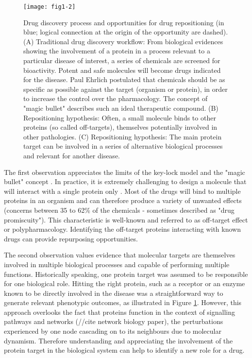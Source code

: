 \begin{figure}[ht]
    \centering
    \texttt{[image: fig1-2]}
    \caption{Drug discovery process and opportunities for drug repositioning (in blue; logical connection at the origin of the opportunity are dashed). (A) Traditional drug discovery workflow: From biological evidences showing the involvement of a protein in a process relevant to a particular disease of interest, a series of chemicals are screened for bioactivity. Potent and safe molecules will become drugs indicated for the disease. Paul Ehrlich postulated that chemicals should be as specific as possible against the target (organism or protein), in order to increase the control over the pharmacology. The concept of "magic bullet" describes such an ideal therapeutic compound. (B) Repositioning hypothesis: Often, a small molecule binds to other proteins (so called off-targets), themselves potentially involved in other pathologies. (C) Repositioning hypothesis: The main protein target can be involved in a series of alternative biological processes and relevant for another disease.}
    \label{fig1-2}
\end{figure}

The first observation appreciates the limits of the key-lock model and the "magic bullet" concept \citep{ehrlichwiki}. In practice, it is extremely challenging to design a molecule that will interact with a single protein only \citep{paolini2006global} \citep{li2010pubchem}. Most of the drugs will bind to multiple proteins in an organism and can therefore produce a variety of unwanted effects (concerns between 35 to 62\% of the chemicals - sometimes described as "drug promiscuity"). This characteristic is well-known and referred to as off-target effect or polypharmacology. Identifying the off-target proteins interacting with known drugs can provide repurposing opportunities.

The second observation values evidence that molecular targets are themselves involved in multiple biological processes and capable of performing multiple functions. Historically speaking, one protein target was assumed to be responsible for one biological role. Hitting the right protein, such as a receptor or an enzyme known to be directly involved in the disease was a straightforward way to generate relevant phenotypic outcomes, as illustrated in Figure \ref{fig1-2}. However, this approach overlooks the fact that proteins function in the context of signalling pathways and networks (//cite network biology paper), the perturbations experienced by one node cascading on to its neighbours due to molecular dynamism. Therefore understanding and appreciating the involvement of the protein target in the biological system can help to identify a new role for a drug.

